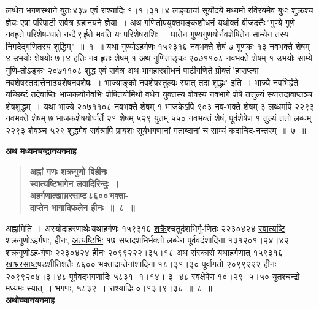 \documentclass[11pt, openany]{book}
\begin{document}
\newpage

\noindent लब्धेन भगणस्थाने युतः\textendash \,४३७ एवं राश्यादिः १।१।३१।४ लङ्कायां सूर्योदये मध्यमो रविरयमेव बुधः शुक्रश्च ज्ञेयः एषा परिपाटी सर्वत्र ग्रहानयने ज्ञेया~। अथ गणितोपयुक्तमङ्कशोधनं यथोक्तं {\color{violet}बीजदत्तैः\textendash \,"गुण्ये गुणे नवहृते परिशेष-घाते नन्दै\textendash \,९\textendash \,र्हृते भवति यः परिशेषराशिः~। घातेन गुण्यगुणयोर्नवशेषितेन साम्येन तस्य निगदेद्गणितस्य शुद्धिम्"~॥~१~॥} यथा गुण्योऽहर्गणः १५९३१६ नवभक्ते शेषं ७ गुणकः १३ नवभक्ते शेषम् ४ उभयोः शेषयोः ७।४ हतिः नव-हृतः शेषम् १ अथ गुणिताङ्कः २०७११०८ नवभक्ते शेषम् १ उभयोः साम्ये गुणि-तोऽङ्कः २०७११०८ शुद्ध एवं सर्वत्र अथ भागहारशोधनं {\color{violet}पाटीगणिते} प्रोक्तं\textendash \,{\color{violet}"हाराप्त्या नवशेषस्तद्यत्तेनाढ्यशेषनवशेषः~। भाज्याङ्को नवशेषस्तुल्यः स्यात् तदा \;शुद्धः"} \;इति~। भाज्ये \;नवभिर्हृते \;यच्छिष्टं \;तदेवाप्तिः \;भाजकयोर्नवभिः शेषितयोर्मिथो वधेन युक्तस्य शेषस्य नवभागे शेषे तत्तुल्यं स्यात्तदावाप्तञ्च शेषशुद्धम्~। यथा भाज्ये २०७११०८ नवभक्ते शेषम् १ भाजकेऽपि ९०३ नव-भक्ते शेषम् ३ लब्धमपि २२९३ नवभक्ते शेषम् ७ भाजकशेषयोर्घार्ते २१ शेषम् ५२९ युतम् ५५० नवभक्तं शेषं, पूर्वशेषेण १ तुल्यं ततो लब्धम् २२९३ शेषञ्च ५२९ शुद्धमेव सर्वत्रापि प्रायशः सूर्यभगणानां गताब्दानां च साम्यं कदाचिद-नन्तरम्~॥~७~॥

\newpage

{\small \textbf{अथ मध्यमचन्द्रानयनमाह\textendash }}

 \label{1.8}
\begin{quote}
{\large \textbf{{\color{purple}अह्नां गणः शक्रगुणो विहीनः \\
स्वात्यष्टिभागेन लवादिरिन्दुः~।\\ 
अहर्गणात्खाभ्ररसाष्ट\textendash \,८६००\textendash \,भक्ता-\\
दाप्तेन भागादिफलेन हीनः~॥~८~॥}}}
\end{quote}

अह्नामिति~। अस्योदाहरणार्थः\textendash \,यथाहर्गणः १५९३१६ \hyperref[1.8]{शक्रै}श्चतुर्दशभिर्गु-णितः २२३०४२४ \hyperref[1.8]{स्वात्यष्टि} शक्रगुणोऽहर्गणः, हीनः, \hyperref[1.8]{अत्यष्टिभिः} १७ सप्तदशभिर्भक्तो लब्धेन पूर्ववदंशादिना १३१२०१।२४।४२ शक्रगुणोऽह-र्गणः \;२२३०४२४ \;हीनः \;२०९९२२२।३५।१८ \;अथ \;संस्कारो \;यथाहर्गणात् १५९३१६ \hyperref[1.8]{खाभ्ररसाष्ट}षडशीतिशतैः ८६०० भक्तादाप्तेनांशादिना १८।३१।३० पूर्वागतो २०९९२२२ हीनः २०९९२०४।३।४८ पूर्ववद्भगणादिः ५८३१।१।१४। ३।४८ स्वक्षेपेण १०।२९।५।५० युतश्चन्द्रो मध्यमः स्यात्~। भगणः, ५८३२~। राश्यादिः ०।१३।९।३८~॥~८~॥\\

{\small \textbf{अथोच्चानयनमाह\textendash }}
\end{document}
